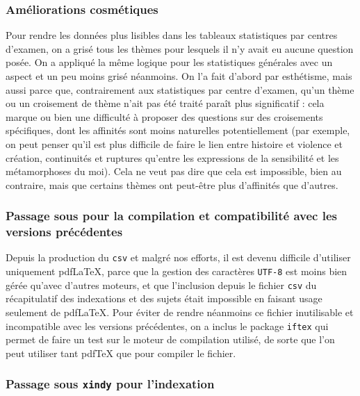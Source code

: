 \subsubsection{Améliorations cosmétiques}

Pour rendre les données plus lisibles dans les tableaux statistiques par centres d'examen, on a grisé tous les thèmes pour lesquels il n'y avait eu aucune question posée. On a appliqué la même logique pour les statistiques générales avec un aspect et un peu moins grisé néanmoins. On l'a fait d'abord par esthétisme, mais aussi parce que, contrairement aux statistiques par centre d'examen, qu'un thème ou un croisement de thème n'ait pas été traité paraît plus significatif : cela marque ou bien une difficulté à proposer des questions sur des croisements spécifiques, dont les affinités sont moins naturelles potentiellement (par exemple, on peut penser qu'il est plus difficile de faire le lien entre histoire et violence et création, continuités et ruptures qu'entre les expressions de la sensibilité et les métamorphoses du moi). Cela ne veut pas dire que cela est impossible, bien au contraire, mais que certains thèmes ont peut-être plus d'affinités que d'autres.

\subsubsection{Passage sous \XeLaTeX{} pour la compilation et compatibilité avec les versions précédentes}

Depuis la production du \texttt{csv} et malgré nos efforts, il est devenu difficile d'utiliser uniquement pdf\LaTeX{}, parce que la gestion des caractères \texttt{UTF-8} est moins bien gérée qu'avec d'autres moteurs, et que l'inclusion depuis le fichier \texttt{csv} du récapitulatif des indexations et des sujets était impossible en faisant usage seulement de pdf\LaTeX{}. Pour éviter de rendre néanmoins ce fichier inutilisable et incompatible avec les versions précédentes, on a inclus le package \texttt{iftex} qui permet de faire un test sur le moteur de compilation utilisé, de sorte que l'on peut utiliser tant pdf\TeX{} que \XeTeX{} pour compiler le fichier.

\subsubsection{Passage sous \texttt{xindy} pour l'indexation}

